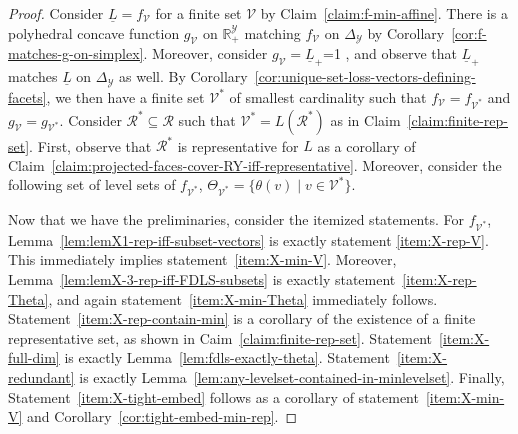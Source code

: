 \documentclass[11pt]{article}
\newcommand{\Comments}{1}
\newcommand{\mytodo}[2]{\ifnum\Comments=1%
  \todo[linecolor=#1!80!black,backgroundcolor=#1,bordercolor=#1!80!black]{#2}\fi}
\newcommand{\jessiet}[1]{\mytodo{teal!20!white}{JF: #1}}
\newcommand{\reals}{\mathbb{R}}
\newcommand{\simplex}{\Delta_\Y}
\newcommand{\R}{\mathcal{R}}
\newcommand{\V}{\mathcal{V}}
\newcommand{\Y}{\mathcal{Y}}
\newcommand{\risk}[1]{\underline{#1}}
\begin{document}
\lemmaX*
\begin{proof}
Consider $\risk L = f_\V$ for a finite set $\V$ by Claim~\ref{claim:f-min-affine}.
There is a polyhedral concave function $g_\V$ on $\reals^\Y_+$ matching $f_\V$ on $\simplex$ by Corollary~\ref{cor:f-matches-g-on-simplex}.
Moreover, consider $g_\V = \risk L_+$\jessiet{is it clear enough that $g_\V = \risk L_+$?}, and observe that $\risk L_+$ matches $\risk L$ on $\simplex$ as well.
By Corollary~\ref{cor:unique-set-loss-vectors-defining-facets}, we then have a finite set $\V^*$ of smallest cardinality such that $f_\V = f_{\V^*}$ and $g_\V = g_{\V^*}$.
Consider $\R^* \subseteq \R$ such that $\V^* = L(\R^*)$ as in Claim~\ref{claim:finite-rep-set}.
First, observe that $\R^*$ is representative for $L$ as a corollary of Claim~\ref{claim:projected-faces-cover-RY-iff-representative}.
Moreover, consider the following set of level sets of $f_{\V^*}$, $\Theta_{\V^*} = \{\theta(v) \mid v \in \V^*\}$.

Now that we have the preliminaries, consider the itemized statements.
For $f_{\V^*}$, Lemma~\ref{lem:lemX1-rep-iff-subset-vectors} is exactly statement \eqref{item:X-rep-V}.
This immediately implies statement~\eqref{item:X-min-V}.
Moreover, Lemma~\ref{lem:lemX-3-rep-iff-FDLS-subsets} is exactly statement~\eqref{item:X-rep-Theta}, and again statement~\eqref{item:X-min-Theta} immediately follows.
Statement~\eqref{item:X-rep-contain-min} is a corollary of the existence of a finite representative set, as shown in Caim~\ref{claim:finite-rep-set}.
Statement~\eqref{item:X-full-dim} is exactly Lemma~\ref{lem:fdls-exactly-theta}.
Statement~\eqref{item:X-redundant} is exactly Lemma~\ref{lem:any-levelset-contained-in-minlevelset}.
Finally, Statement~\eqref{item:X-tight-embed} follows as a corollary of statement~\eqref{item:X-min-V} and Corollary~\ref{cor:tight-embed-min-rep}.
\end{proof}
\end{document}
